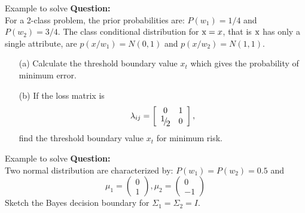 
%

\begin{frame}{Example to solve}
\textbf{\color{blue}Question:}\\
For a 2-class problem, the prior probabilities are: $P(w_1)={1}/{4}$
and $P(w_2)={3}/{4}$. The class conditional distribution for ${\rm x}=x$,  that is ${\rm x}$ has only a single attribute, are
$p(x/w_1)=N(0,1)$ and 
$p(x/w_2)=N(1,1)$.
\begin{itemize}
\item[(a)] Calculate the threshold boundary value $x_t$ which gives the probability of minimum error.
\item[(b)] If the loss matrix is 
\begin{equation*}
{\lambda _{ij}} = \left[ {\begin{array}{*{20}{c}}
  0&1 \\ 
  {{\raise0.7ex\hbox{$1$} \!\mathord{\left/
 {\vphantom {1 2}}\right.\kern-\nulldelimiterspace}
\!\lower0.7ex\hbox{$2$}}}&0 
\end{array}} \right],
\end{equation*}
find the threshold boundary value $x_t$ for minimum risk.
\end{itemize}
\end{frame}

\begin{frame}{Example to solve}
\textbf{\color{blue} Question:}\\
Two normal distribution are characterized by: $P(w_1)=P(w_2)=0.5$ and
\[{\mu _1} = \left( {\begin{array}{*{20}{c}}
  0 \\ 
  1 
\end{array}} \right),{\mu _2} = \left( {\begin{array}{*{20}{c}}
  0 \\ 
  { - 1} 
\end{array}} \right)\]
Sketch the Bayes decision boundary for $\Sigma_1=\Sigma_2=I$.
\end{frame}

